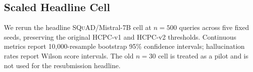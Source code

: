 
\subsection{Scaled Headline Cell}
\label{sec:fix02_scaled_headline}


We rerun the headline \textsc{SQuAD}/Mistral-7B cell at $n=500$ queries
across five fixed seeds, preserving the original HCPC-v1 and HCPC-v2
thresholds. Continuous metrics report 10{,}000-resample bootstrap 95\%
confidence intervals; hallucination rates report Wilson score intervals.
The old $n=30$ cell is treated as a pilot and is not used for the
resubmission headline.

